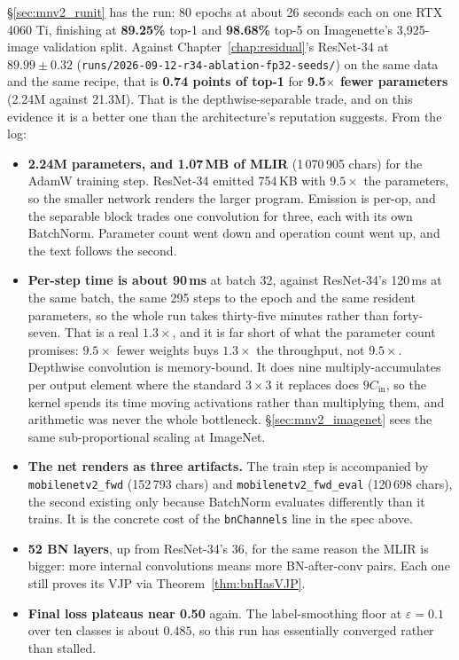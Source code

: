 \S\ref{sec:mnv2_runit} has the run: 80 epochs at about 26
seconds each on one RTX 4060 Ti, finishing at \textbf{89.25\%}
top-1 and \textbf{98.68\%} top-5 on Imagenette's 3,925-image
validation split. Against Chapter~\ref{chap:residual}'s ResNet-34 at $89.99 \pm 0.32$
(\texttt{runs/2026-09-12-r34-ablation-fp32-seeds/}) on the same data and the same recipe, that is
\textbf{0.74 points of top-1} for \textbf{9.5$\times$ fewer parameters}
(2.24M against 21.3M). That is the depthwise-separable trade, and on
this evidence it is a better one than the architecture's reputation
suggests. From the log:

\begin{itemize}
\item \textbf{2.24M parameters, and 1.07\,MB of MLIR} (1\,070\,905 chars)
  for the AdamW training step. ResNet-34 emitted 754\,KB with $9.5\times$
  the parameters, so the smaller network renders the larger
  program. Emission is per-op, and the separable block trades one
  convolution for three, each with its own BatchNorm. Parameter count
  went down and operation count went up, and the text follows the
  second.

\item \textbf{Per-step time is about 90\,ms} at batch 32, against
  ResNet-34's 120\,ms at the same batch, the same 295 steps to the epoch
  and the same resident parameters, so the whole run takes thirty-five
  minutes rather than forty-seven. That is a real $1.3\times$, and it is
  far short of what the parameter count promises: $9.5\times$ fewer
  weights buys $1.3\times$ the throughput, not $9.5\times$. Depthwise
  convolution is
  memory-bound. It does nine multiply-accumulates per output element
  where the standard $3 \times 3$ it replaces does $9 C_\text{in}$, so
  the kernel spends its time moving activations rather than multiplying
  them, and arithmetic was never the whole bottleneck.
  \S\ref{sec:mnv2_imagenet} sees the same sub-proportional scaling at
  ImageNet.

\item \textbf{The net renders as three artifacts.} The train step is accompanied by
  \texttt{mobilenetv2\_fwd} (152\,793 chars) and
  \texttt{mobilenetv2\_fwd\_eval} (120\,698 chars), the second existing
  only because BatchNorm evaluates differently than it trains. It is
  the concrete cost of the \texttt{bnChannels} line in the spec above.

\item \textbf{52 BN layers}, up from ResNet-34's 36, for the same reason
  the MLIR is bigger: more internal convolutions means more
  BN-after-conv pairs. Each one still proves its VJP via
  Theorem~\ref{thm:bnHasVJP}.

\item \textbf{Final loss plateaus near 0.50} again. The label-smoothing floor at
  $\varepsilon = 0.1$ over ten classes is about $0.485$, so this run has
  essentially converged rather than stalled.
\end{itemize}

